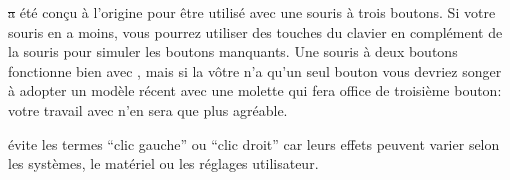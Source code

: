 \documentclass[a4paper,10pt,twoside]{book}
\begin{document}
\st a été conçu à l'origine pour être utilisé avec une souris à trois
boutons. Si votre souris en a moins, vous pourrez utiliser des touches
du clavier en complément de la souris pour simuler les boutons
manquants. Une souris à deux boutons fonctionne bien avec \pharo, mais si
la vôtre n'a qu'un seul bouton vous devriez songer à adopter un
modèle récent avec une molette qui fera office de troisième bouton: votre travail avec \pharo n'en sera que plus agréable.

\pharo évite les termes ``clic gauche'' ou ``clic droit'' car leurs
effets peuvent varier selon les systèmes, le matériel ou les
réglages utilisateur.
\end{document}
